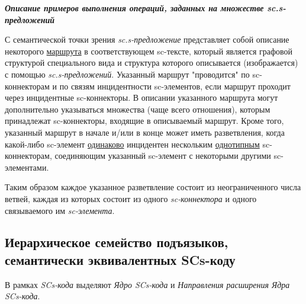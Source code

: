 \textbf{\textit{Описание примеров выполнения операций, заданных на множестве sc.s-предложений}}

С семантической точки зрения \textit{sc.s-предложение} представляет собой описание некоторого \uline{маршрута} в соответствующем sc-тексте, который является графовой структурой специального вида и структура которого описывается (изображается) с помощью \textit{sc.s-предложений}. Указанный маршрут "проводится"{} по sc-коннекторам и по связям инцидентности sc-элементов, если маршрут проходит через инцидентные sc-коннекторы. В описании указанного маршрута могут дополнительно указываться множества (чаще всего отношения), которым принадлежат sc-коннекторы, входящие в описываемый маршрут. Кроме того, указанный маршрут в начале и/или в конце может иметь разветвления, когда какой-либо sc-элемент \uline{одинаково} инцидентен нескольким \uline{однотипным} sc-коннекторам, соединяющим указанный sc-элемент с некоторыми другими sc-элементами.

Таким образом каждое указанное разветвление состоит из неограниченного числа ветвей, каждая из которых состоит из одного \textit{sc-коннектора} и одного связываемого им \textit{sc-элемента}.

\subsection{Иерархическое семейство подъязыков, семантически эквивалентных SCs-коду}
\label{sec_scs_extensions}

В рамках \textit{SCs-кода} выделяют \textit{Ядро SCs-кода} и \textit{Направления расширения Ядра SCs-кода}.

\begin{SCn}
\end{SCn}

